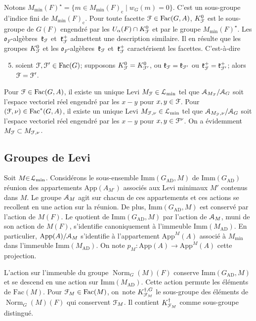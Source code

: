 \documentclass[11pt]{article}
\numberwithin{equation}{section}\providecommand{\og}{«\,}\providecommand{\fg}{\,»}
\let\mathcal \EuScript
\let\sep\mid
\newcommand{\frk}{\mathfrak{k}}
\newcommand{\fro}{\mathfrak{o}}
\newcommand{\AD}{\mathrm{AD}}
\newcommand{\App}{\mathrm{App}}
\newcommand{\rc}{\mathrm{c}}
\newcommand{\Fac}{\mathrm{Fac}}
\newcommand{\Imm}{\mathrm{Imm}}
\DeclareMathOperator{\Norm}{Norm}
\newcommand{\cA}{\mathcal{A}}
\newcommand{\cF}{\mathcal{F}}
\newcommand{\cL}{\mathcal{L}}
\theoremstyle{plain}
\theoremstyle{definition}
\begin{document}
Notons $M_{\min}(F)^{\star}=\{m\in M_{\min}(F)_{\rc}\sep w_{G}(m)=0\}$. C'est un sous-groupe d'indice fini de $M_{\min}(F)_{\rc}$. Pour toute facette $\cF\in \Fac(G,A)$, $K_{\cF}^0$ est le sous-groupe de $G(F)$ engendré par les $U_{\alpha}(F)\cap K_{\cF}^0$ et par le groupe $M_{\min}(F)^{\star}$. Les $\fro_{F}$-algèbres~$\frk_{\cF}$ et~$\frk_{\cF}^+$ admettent une description similaire. Il en résulte que
les groupes $K_{\cF}^0$ et les $\fro_{F}$-algèbres~$\frk_{\cF}$ et~$\frk_{\cF}^+$ caractérisent les facettes. C'est-à-dire
\begin{enumerate}\setcounter{enumi}{4}
\item\label{description5}
soient $\cF,\cF'\in \Fac(G)$; supposons $K_{\cF}^0=K_{\cF'}^0$, ou $\frk_{\cF}=\frk_{\cF'}$ ou $\frk^+_{\cF}=\frk^+_{\cF'}$; alors $\cF=\cF'$.
\end{enumerate}

Pour $\cF\in \Fac(G,A)$, il existe un unique Levi $M_{\cF}\in \cL_{\min}$ tel que $\cA_{M_{\cF}}/\cA_{G}$ soit l'espace vectoriel réel engendré par les $x-y$ pour $x,y\in \cF$. Pour $(\cF,\nu)\in \Fac^*(G,A)$, il existe un unique Levi $M_{\cF,\nu}\in \cL_{\min}$ tel que $\cA_{M_{\cF},\nu}/\cA_{G}$ soit l'espace vectoriel réel engendré par les $x-y$ pour $x,y\in \cF^{\nu}$. On a évidemment $M_{\cF}\subset M_{\cF,\nu}$.

\subsection{Groupes de Levi}\label{groupesdelevi}
Soit $M\!\!\in\!\cL_{\min}$. Considérons le sous-ensemble $\Imm(G_{\AD},M)$ de $\Imm(G_{\AD})$ réunion des appartements $\App(A_{M'})$ associés aux Levi minimaux $M'$ contenus dans $M$. Le groupe $\cA_{M}$ agit sur chacun de ces appartements et ces actions se recollent en une action sur la réunion. De plus, $\Imm(G_{\AD},M)$ est conservé par l'action de $M(F)$. Le quotient de $\Imm(G_{\AD},M)$ par l'action de $\cA_{M}$, muni de son action de $M(F)$, s'identifie canoniquement à l'immeuble $\Imm(M_{\AD})$. En particulier, $\App(A)/\cA_{M}$ s'identifie à l'appartement $\App^M(A)$ associé à $M_{\min}$ dans l'immeuble $\Imm(M_{\AD})$. On note $p_{M}:\App(A)\to \App^M(A)$ cette projection.

L'action sur l'immeuble du groupe $\Norm_{G}(M)(F)$ conserve $\Imm(G_{\AD},M)$ et se descend en une action sur $\Imm(M_{\AD})$. Cette action permute les éléments de $\Fac(M)$. Pour $\cF_{M}\in \Fac(M)$, on~note $K_{\cF_{M}}^{\dag,G}$ le sous-groupe des éléments de $\Norm_{G}(M)(F)$ qui conservent $\cF_{M}$. Il contient $K_{\cF_{M}}^{\dag}$ comme sous-groupe distingué.
\end{document}
